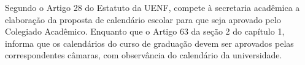 Segundo o Artigo 28 do Estatuto da UENF, compete à secretaria acadêmica a elaboração da proposta de calendário escolar para que seja aprovado pelo Colegiado Acadêmico. Enquanto que o Artigo 63 da seção 2 do capítulo 1, informa que os calendários do curso de graduação devem ser aprovados pelas correspondentes câmaras, com observância do calendário da universidade.
\begin{comment}
\begin{table}[H] \centering
  \caption{Calendário Acadêmico da SECACAD de 2023.1 (simplificado para mostrar apenas os eventos relevantes)}
  \label{tab:calendario_SECACAD-2023.1}
  \begin{tabular}{| l r |}
    \hline
    \textbf{Atividades}                                                                           & \textbf{Data}           \\
    \hline
    Prazo limite de cadastro de novas disciplinas a serem oferecidas no 1º período letivo de 2023 & até 20/01/2023          \\
    Prazo limite para criação de turmas a serem oferecidas no 1º período letivo de 2023           & 20/01/2023 a 15/02/2023 \\
    Renovação de matrícula do 1º período letivo/2023                                              & 28/02 a 03/03           \\
    Início do 1º período letivo de 2023                                                           & 06/03                   \\
    Inclusão e exclusão de disciplinas                                                            & 06/03 à 20/03           \\
    Encerramento do 1º período letivo de 2023                                                     & 07/07                   \\
    \hline
  \end{tabular}
\end{table}


\end{comment}
